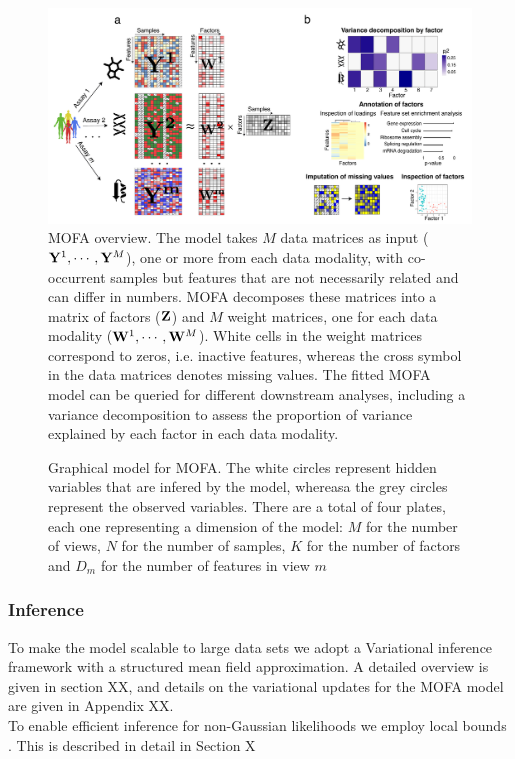 \begin{figure}[H]
	\begin{center}
		\includegraphics[width=1.0\textwidth]{MOFA}
		\caption{MOFA overview. The model takes $M$ data matrices as input (${\bf Y}^1, \cdots, {\bf Y}^M$), one or more from each data modality, with co-occurrent samples but features that are not necessarily related and can differ in numbers. MOFA decomposes these matrices into a matrix of factors (${\bf Z}$) and $M$ weight matrices, one for each data modality (${\bf W}^1, \cdots, {\bf W}^M$). White cells in the weight matrices correspond to zeros, i.e. inactive features, whereas the cross symbol in the data matrices denotes missing values. The fitted MOFA model can be queried for different downstream analyses, including a variance decomposition to assess the proportion of variance explained by each factor in each data modality.}
		\label{fig:MOFA}
	\end{center}
\end{figure}

\begin{figure}[H]
	\centering
	
	\caption{Graphical model for MOFA. The white circles represent hidden variables that are infered by the model, whereasa the grey circles represent the observed variables. There are a total of four plates, each one representing a dimension of the model: $M$ for the number of views, $N$ for the number of samples, $K$ for the number of factors and $D_m$ for the number of features in view $m$}
	\label{fig:MOFA_graphical_model}
\end{figure}

\subsubsection{Inference}
To make the model scalable to large data sets we adopt a Variational inference framework with a structured mean field approximation. 
A detailed overview is given in section XX, and details on the variational updates for the MOFA model are given in Appendix XX.\\
To enable efficient inference for non-Gaussian likelihoods we employ local bounds \cite{XX}. This is described in detail in Section X

